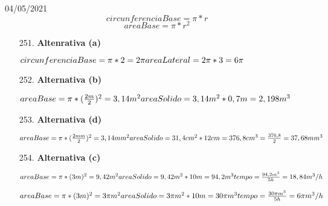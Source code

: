 \documentclass{SchoolBook}
\begin{document}
    \begin{day}{04/05/2021}
        $$ circunferenciaBase = \pi * r $$
        $$ areaBase = \pi * r^2 $$
    
        \begin{enumerate}
            \item[251.] \textbf{Altenrativa (a)}
            
            \begin{math}
                circunferenciaBase = \pi * 2 = 2\pi \\
                areaLateral = 2\pi * 3 = 6\pi
            \end{math}
            
            \item[252.] \textbf{Alternativa (b)}
            
            \begin{math}
                areaBase = \pi * (\frac{2m}{2})^2 = 3,14 m^2 \\
                areaSolido = 3,14 m^2 * 0,7 m = 2,198 m^3
            \end{math}
            
            \item[253.] \textbf{Alternativa (d)}
            
            \begin{math}
                areaBase = \pi * (\frac{2mm}{2})^2 = 3,14 mm^2 \\
                areaSolido = 31,4 cm^2 * 12cm = 376,8 cm^3 = \frac{376,8}{2} = 37,68 mm^3
            \end{math}
            
            \item[254.] \textbf{Alternativa (c)}
            
            \begin{math}
                areaBase = \pi * (3m)^2 = 9,42 m^2 \\
                areaSolido = 9,42 m^2 * 10m = 94,2 m^3 \\
                tempo = \frac{94,2 m^3}{5 h} = 18,84 m^3 / h
            \end{math}
            
            \begin{math}
                areaBase = \pi * (3m)^2 = 3\pi m^2 \\
                areaSolido = 3\pi m^2 * 10m = 30\pi m^3 \\
                tempo = \frac{30\pi m^3}{5 h} = 6 \pi m^3 / h
            \end{math}
            
        \end{enumerate}
    \end{day}
\end{document}
